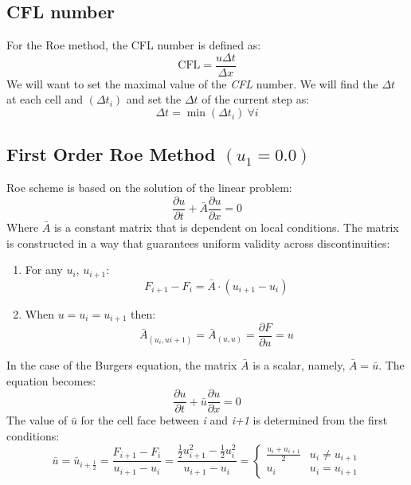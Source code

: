 \documentclass[11pt, a4paper]{article}
\begin{document}
\subsection{CFL number}
For the Roe method, the CFL number is defined as:
\begin{equation}
    \mathrm{CFL}=\frac{u\Delta t}{\Delta x}
\end{equation}
We will want to set the maximal value of the \emph{CFL} number. We will find the $\Delta t$ at each cell and $\left(\Delta t_i\right)$ and set the $\Delta t$ of the current step as:
\begin{equation}
    \Delta t=\min\left(\Delta t_i\right)\ \forall i
\end{equation}

\subsection{First Order Roe Method $(u_1 = 0.0)$}
\label{Roe_first}
Roe scheme is based on the solution of the linear problem:
\begin{equation}
        \displaystyle\frac{\partial u}{\partial t} + \bar{A}\frac{\partial u}{\partial x} = 0 
\end{equation}
Where $\bar{A}$ is a constant matrix that is dependent on local conditions. The matrix is constructed in a way that guarantees uniform validity across discontinuities: 
\begin{enumerate}
    \item For any $u_i$, $u_{i+1}$:\begin{equation*}
        F_{i+1}-F_{i} = \bar{A}\cdot\left(u_{i+1}-u_i\right)
    \end{equation*}
    \item When $u=u_i=u_{i+1}$ then:\begin{equation*}
        \bar{A}_{\left(u_i,u{i+1}\right)}=\bar{A}_{\left(u,u\right)}=\frac{\partial F}{\partial u}=u
    \end{equation*}
\end{enumerate}
In the case of the Burgers equation, the matrix $\bar{A}$ is a scalar, namely, $\bar{A}=\bar{u}$. The equation becomes:
\begin{equation}
        \displaystyle\frac{\partial u}{\partial t} + \bar{u}\frac{\partial u}{\partial x} = 0 
\end{equation}
The value of $\bar{u}$ for the cell face between \emph{i} and \emph{i+1} is determined from the first conditions:
\begin{equation}
    \bar{u}=\bar{u}_{i+\frac{1}{2}}=\frac{F_{i+1}-F_i}{u_{i+1}-u_i}=\frac{\displaystyle\frac{1}{2}u_{i+1}^2-\frac{1}{2}u_i^2}{u_{i+1}-u_i}=\left\{\begin{array}{cc}
        \displaystyle\frac{u_i+u_{i+1}}{2} & u_i\neq u_{i+1} \\
        u_i & u_i=u_{i+1} 
    \end{array}\right.
\end{equation}
\end{document}
